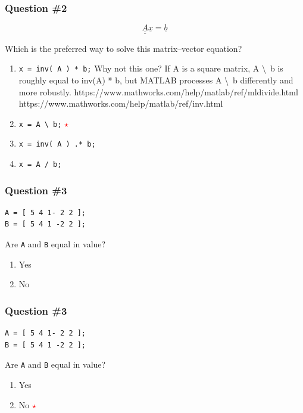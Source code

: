 \documentclass[11pt]{beamer}
\newcommand{\correctstar}{{\Large\textcolor{red}{$\star$}}}
\begin{document}
\begin{frame}[fragile]
  \frametitle{Question \#2}

  $$
\underline{\underline{A}} \underline{x} = \underline{b}
  $$

Which is the preferred way to solve this matrix--vector equation?

  \begin{enumerate}[label=\Alph*]
    \item  \texttt{x = inv( A ) * b;}  Why not this one?
    If A is a square matrix, A \textbackslash ~b is roughly equal to inv(A) * b, but MATLAB processes  A \textbackslash ~b differently and more robustly. https://www.mathworks.com/help/matlab/ref/mldivide.html
    https://www.mathworks.com/help/matlab/ref/inv.html
    \item  \texttt{x = A \textbackslash ~b;}  \correctstar
    \item  \texttt{x = inv( A ) .* b;}
    \item  \texttt{x = A / b;}
  \end{enumerate}
\end{frame}

\begin{frame}[fragile]
  \frametitle{Question \#3}
  \Enlarge

  \begin{Verbatim}
A = [ 5 4 1- 2 2 ];
B = [ 5 4 1 -2 2 ];
  \end{Verbatim}

Are \texttt{A} and \texttt{B} equal in value?

  \begin{enumerate}[label=\Alph*]
    \item  Yes
    \item  No
  \end{enumerate}
\end{frame}

\begin{frame}[fragile]
  \frametitle{Question \#3}
  \Enlarge

  \begin{Verbatim}
A = [ 5 4 1- 2 2 ];
B = [ 5 4 1 -2 2 ];
  \end{Verbatim}

Are \texttt{A} and \texttt{B} equal in value?

  \begin{enumerate}[label=\Alph*]
    \item  Yes
    \item  No  \correctstar
  \end{enumerate}
\end{frame}
\end{document}
